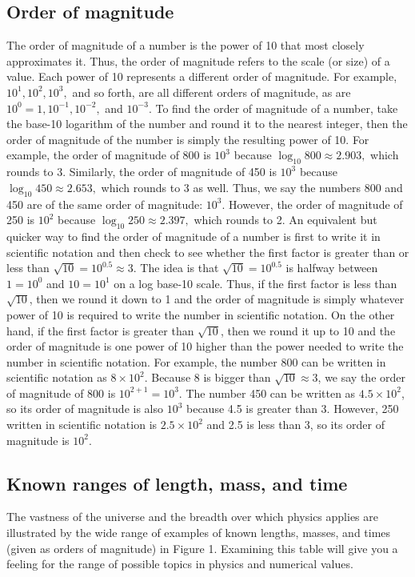 \documentclass{report}
\begin{document}
    \subsection{Order of magnitude}
    The order of magnitude of a number is the power of 10 that most closely approximates it. Thus, the order of magnitude refers to the scale (or size) of a value. Each power of 10 represents a different order of magnitude. For example, \( 10^1, 10^2, 10^3, \) and so forth, are all different orders of magnitude, as are \( 10^0 = 1, 10^{-1}, 10^{-2}, \) and \( 10^{-3} \). To find the order of magnitude of a number, take the base-10 logarithm of the number and round it to the nearest integer, then the order of magnitude of the number is simply the resulting power of 10. For example, the order of magnitude of 800 is \( 10^3 \) because \( \log_{10}800 \approx 2.903, \) which rounds to 3. Similarly, the order of magnitude of 450 is \( 10^3 \) because \( \log_{10}450 \approx 2.653, \) which rounds to 3 as well. Thus, we say the numbers 800 and 450 are of the same order of magnitude: \( 10^3 \). However, the order of magnitude of 250 is \( 10^2 \) because \( \log_{10}250 \approx 2.397, \) which rounds to 2.
    \bigbreak \noindent 
    An equivalent but quicker way to find the order of magnitude of a number is first to write it in scientific notation and then check to see whether the first factor is greater than or less than \( \sqrt{10} = 10^{0.5} \approx 3 \). The idea is that \( \sqrt{10} = 10^{0.5} \) is halfway between \( 1 = 10^0 \) and \( 10 = 10^1 \) on a log base-10 scale. Thus, if the first factor is less than \( \sqrt{10} \), then we round it down to 1 and the order of magnitude is simply whatever power of 10 is required to write the number in scientific notation. On the other hand, if the first factor is greater than \( \sqrt{10} \), then we round it up to 10 and the order of magnitude is one power of 10 higher than the power needed to write the number in scientific notation. For example, the number 800 can be written in scientific notation as \( 8 \times 10^2 \). Because 8 is bigger than \( \sqrt{10} \approx 3 \), we say the order of magnitude of 800 is \( 10^{2+1} = 10^3 \). The number 450 can be written as \( 4.5 \times 10^2 \), so its order of magnitude is also \( 10^3 \) because 4.5 is greater than 3. However, 250 written in scientific notation is \( 2.5 \times 10^2 \) and 2.5 is less than 3, so its order of magnitude is \( 10^2 \).

    \pagebreak 
    \subsection{Known ranges of length, mass, and time}
    \bigbreak \noindent 
    The vastness of the universe and the breadth over which physics applies are illustrated by the wide range of examples of known lengths, masses, and times (given as orders of magnitude) in Figure 1. Examining this table will give you a feeling for the range of possible topics in physics and numerical values.
    \bigbreak \noindent 
\end{document}
